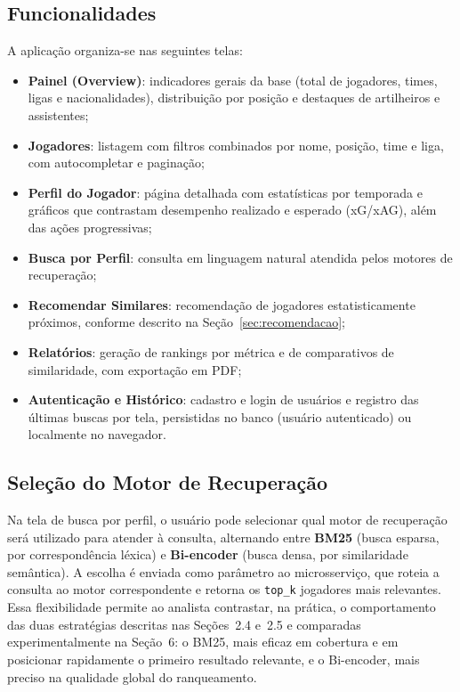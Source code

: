 \documentclass[portuguese]{sbc2025}
\begin{document}
\subsection{Funcionalidades}
A aplicação organiza-se nas seguintes telas:
\begin{itemize}
\item \textbf{Painel (Overview)}: indicadores gerais da base (total de
jogadores, times, ligas e nacionalidades), distribuição por posição e destaques
de artilheiros e assistentes;
\item \textbf{Jogadores}: listagem com filtros combinados por nome, posição,
time e liga, com autocompletar e paginação;
\item \textbf{Perfil do Jogador}: página detalhada com estatísticas por
temporada e gráficos que contrastam desempenho realizado e esperado (xG/xAG),
além das ações progressivas;
\item \textbf{Busca por Perfil}: consulta em linguagem natural atendida pelos
motores de recuperação;
\item \textbf{Recomendar Similares}: recomendação de jogadores estatisticamente
próximos, conforme descrito na Seção~\ref{sec:recomendacao};
\item \textbf{Relatórios}: geração de rankings por métrica e de comparativos de
similaridade, com exportação em PDF;
\item \textbf{Autenticação e Histórico}: cadastro e login de usuários e registro
das últimas buscas por tela, persistidas no banco (usuário autenticado) ou
localmente no navegador.
\end{itemize}

\subsection{Seleção do Motor de Recuperação}
Na tela de busca por perfil, o usuário pode selecionar qual motor de recuperação
será utilizado para atender à consulta, alternando entre \textbf{BM25} (busca
esparsa, por correspondência léxica) e \textbf{Bi-encoder} (busca densa, por
similaridade semântica). A escolha é enviada como parâmetro ao microsserviço, que
roteia a consulta ao motor correspondente e retorna os \texttt{top\_k} jogadores
mais relevantes. Essa flexibilidade permite ao analista contrastar, na prática, o
comportamento das duas estratégias descritas nas Seções~2.4 e~2.5 e comparadas
experimentalmente na Seção~6: o BM25, mais eficaz em cobertura e em posicionar
rapidamente o primeiro resultado relevante, e o Bi-encoder, mais preciso na
qualidade global do ranqueamento.
\end{document}
